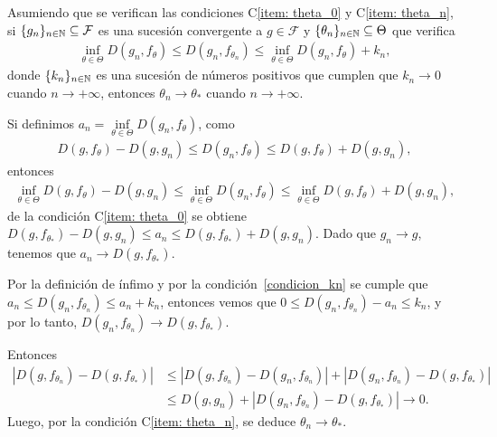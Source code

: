 \begin{proposition}
	Asumiendo que se verifican las condiciones C\ref{item: theta_0} y C\ref{item: theta_n}, si $\{g_{n}\}_{n\in\mathbb{N}} \subseteq \mathcal{F}$ es una sucesión convergente a $g \in \mathcal{F}$ y 
	$\{\theta_{n}\}_{n\in\mathbb{N}} \subseteq \Theta$ que verifica
	\begin{align}
	\label{condicion_kn}
	\inf_{\theta\in\Theta} D(g_{n},f_{\theta}) \le D(g_{n},f_{\theta_n}) \le \inf_{\theta\in\Theta} D(g_{n},f_{\theta}) + k_{n},
	\end{align}
	donde $\{k_{n}\}_{n\in\mathbb{N}}$ es una sucesión de números positivos que cumplen que $k_{n} \to 0$ cuando $n \to +\infty$, entonces $\theta_{n} \to \theta_{*}$ cuando $n \to +\infty$.
\end{proposition}
\begin{dem}
	Si definimos $a_{n} = \inf\limits_{\theta\in\Theta} D(g_{n},f_{\theta})$, 
	como %
	\begin{align*}
	D(g,f_{\theta}) - D(g, g_{n}) \le D(g_{n},f_{\theta}) \le D(g,f_{\theta}) + D(g, g_{n}),
	\end{align*}
	entonces
	\begin{align*}
	\inf_{\theta\in\Theta} D(g,f_{\theta}) - D(g, g_{n}) \le \inf_{\theta\in\Theta} D(g_{n},f_{\theta}) 
	\le \inf_{\theta\in\Theta} D(g,f_{\theta}) + D(g, g_{n}),
	\end{align*}
	de la condición C\ref{item: theta_0} se obtiene
	$D(g,f_{\theta_{*}}) - D(g, g_{n}) \le a_{n} \le D(g,f_{\theta_{*}}) + D(g, g_{n})$.
	Dado que $g_{n} \to g$, tenemos que $a_{n} \to D(g,f_{\theta_{*}})$.
	
	Por la definición de ínfimo y por la condición~\ref{condicion_kn} se cumple que $a_{n} \le D(g_{n},f_{\theta_{n}}) \le a_{n} + k_{n}$,
	entonces vemos que $0 \le D(g_{n},f_{\theta_{n}}) - a_{n} \le k_{n}$, y por lo tanto,
	$D(g_{n},f_{\theta_{n}}) \to D(g,f_{\theta_{*}})$.
	
	Entonces 
	\begin{align*}
	|D(g,f_{\theta_{n}}) - D(g,f_{\theta_{*}})| & \le |D(g,f_{\theta_{n}}) - D(g_{n},f_{\theta_{n}})|
	+ |D(g_{n},f_{\theta_{n}}) - D(g,f_{\theta_{*}})| \\
	& \le D(g, g_{n}) + |D(g_{n},f_{\theta_{n}}) - D(g,f_{\theta_{*}})| \to 0.
	\end{align*}
	Luego, por la condición C\ref{item: theta_n}, se deduce $\theta_{n} \to \theta_{*}$.
\end{dem}

